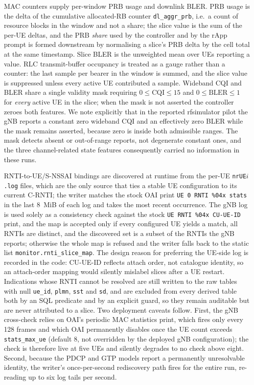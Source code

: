 MAC counters supply per-window PRB usage and downlink BLER. PRB usage is the delta of the cumulative allocated-RB counter \texttt{dl\_aggr\_prb}, i.e.\ a count of resource blocks in the window and not a share; the slice value is the sum of the per-UE deltas, and the PRB \emph{share} used by the controller and by the rApp prompt is formed downstream by normalising a slice's PRB delta by the cell total at the same timestamp. Slice BLER is the unweighted mean over UEs reporting a value. RLC transmit-buffer occupancy is treated as a gauge rather than a counter: the last sample per bearer in the window is summed, and the slice value is suppressed unless every active UE contributed a sample. Wideband CQI and BLER share a single validity mask requiring $0\leq\mathrm{CQI}\leq15$ and $0\leq\mathrm{BLER}\leq1$ for \emph{every} active UE in the slice; when the mask is not asserted the controller zeroes both features. We note explicitly that in the reported rfsimulator pilot the gNB reports a constant zero wideband CQI and an effectively zero BLER while the mask remains asserted, because zero is inside both admissible ranges. The mask detects absent or out-of-range reports, not degenerate constant ones, and the three channel-related state features consequently carried no information in these runs.

RNTI-to-UE/S-NSSAI bindings are discovered at runtime from the per-UE \texttt{nrUE$i$.log} files, which are the only source that ties a stable UE configuration to its current C-RNTI; the writer matches the stock OAI print \texttt{UE 0 RNTI \%04x stats} in the last 8~MiB of each log and takes the most recent occurrence. The gNB log is used solely as a consistency check against the stock \texttt{UE RNTI \%04x CU-UE-ID} print, and the map is accepted only if every configured UE yields a match, all RNTIs are distinct, and the discovered set is a subset of the RNTIs the gNB reports; otherwise the whole map is refused and the writer falls back to the static list \texttt{monitor.rnti\_slice\_map}. The design reason for preferring the UE-side log is recorded in the code: CU-UE-ID reflects attach order, not catalogue identity, so an attach-order mapping would silently mislabel slices after a UE restart. Indications whose RNTI cannot be resolved are still written to the raw tables with null \texttt{ue\_id}, \texttt{plmn}, \texttt{sst} and \texttt{sd}, and are excluded from every derived table both by an SQL predicate and by an explicit guard, so they remain auditable but are never attributed to a slice. Two deployment caveats follow. First, the gNB cross-check relies on OAI's periodic MAC statistics print, which fires only every 128 frames and which OAI permanently disables once the UE count exceeds \texttt{stats\_max\_ue} (default 8, not overridden by the deployed gNB configuration); the check is therefore live at five UEs and silently degrades to no check above eight. Second, because the PDCP and GTP models report a permanently unresolvable identity, the writer's once-per-second rediscovery path fires for the entire run, re-reading up to six log tails per second.

